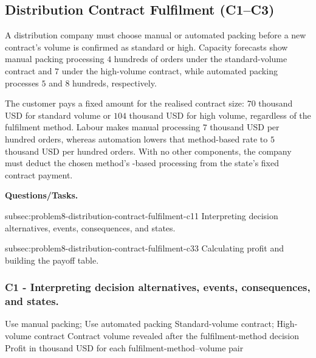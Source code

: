 
	\subsection{Distribution Contract Fulfilment (C1--C3)}
	\label{sec:problem8-distribution-contract-fulfilment-c1-c3}

	A distribution company must choose manual or automated packing before a new contract's volume is confirmed as standard or high. Capacity forecasts show manual packing processing \(4\) hundreds of orders under the standard-volume contract and \(7\) under the high-volume contract, while automated packing processes \(5\) and \(8\) hundreds, respectively.

	The customer pays a fixed amount for the realised contract size: \(70\) thousand USD for standard volume or \(104\) thousand USD for high volume, regardless of the fulfilment method. Labour makes manual processing  \(7\) thousand USD per hundred orders, whereas automation lowers that method-based rate to \(5\) thousand USD per hundred orders. With no other components, the company must deduct the chosen method's -based processing  from the state's fixed contract payment.

	\textbf{Questions/Tasks.}
	\begin{enumerate}
		\CriterionTask
		{subsec:problem8-distribution-contract-fulfilment-c1}{1}
		{Interpreting decision alternatives, events, consequences, and states.}

		\CriterionTask
		{subsec:problem8-distribution-contract-fulfilment-c3}{3}
		{Calculating profit and building the payoff table.}
	\end{enumerate}

	\subsubsection*{C1 - Interpreting decision alternatives, events, consequences, and states.}
	\label{subsec:problem8-distribution-contract-fulfilment-c1}

	\DecisionElementsTable
	{Use manual packing; Use automated packing}
	{Standard-volume contract; High-volume contract}
	{Contract volume revealed after the fulfilment-method decision}
	{Profit in thousand USD for each fulfilment-method--volume pair}

